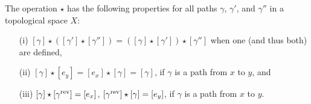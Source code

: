 \begin{thm}
  \label{concatenation-homotopy}
  The operation $\star$ has the following properties for all paths $\gamma$, $\gamma'$, and $\gamma''$ in a topological space $X$:
  \begin{itemize}
    \item[(i)] $[\gamma] \star ([\gamma'] \star [\gamma'']) = ([\gamma] \star [\gamma']) \star [\gamma'']$ when one (and thus both) are defined,
    \item[(ii)] $[\gamma] \star [e_y] = [e_x] \star [\gamma] = [\gamma]$, if $\gamma$ is a path from $x$ to $y$, and
    \item[(iii)] $[\gamma] \star [\gamma^{\mathrm{rev}}] = [e_x]$, $[\gamma^{\mathrm{rev}}] \star [\gamma] = [e_y]$, if $\gamma$ is a path from $x$ to $y$.
  \end{itemize}
\end{thm}
